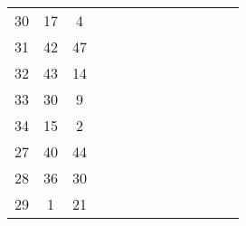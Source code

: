 \begin{table}[tb]
\begin{tabular}{|c|c|c|cccccccccc}
	30 & 17 & 4  &                         &                         &                         &                         &                        &                         &                         &                         &                        &                        \\ \cline{1-3}
	31 & 42 & 47 &                         &                         &                         &                         &                        &                         &                         &                         &                        &                        \\ \cline{1-3}
	32 & 43 & 14 &                         &                         &                         &                         &                        &                         &                         &                         &                        &                        \\ \cline{1-3}
	33 & 30 & 9  &                         &                         &                         &                         &                        &                         &                         &                         &                        &                        \\ \cline{1-3}
	34 & 15 & 2  &                         &                         &                         &                         &                        &                         &                         &                         &                        &                        \\ \cline{1-3}
	27 & 40 & 44 &                         &                         &                         &                         &                        &                         &                         &                         &                        &                        \\ \cline{1-3}
	28 & 36 & 30 &                         &                         &                         &                         &                        &                         &                         &                         &                        &                        \\ \cline{1-3}
	29 & 1  & 21 &                         &                         &                         &                         &                        &                         &                         &                         &                        &                        \\ \cline{1-3}

\end{tabular}
\end{table}
